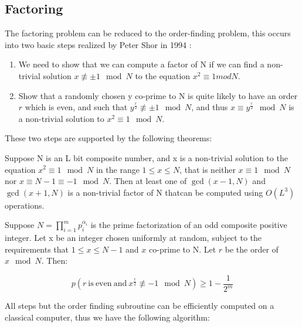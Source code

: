 \subsection{Factoring}
\label{subsec: Factoring}

The factoring problem can be reduced to the order-finding problem, this occurs into two basic steps realized by Peter Shor in 1994 \citep{Shor}: 

\begin{enumerate}
    \item We need to show that we can compute a factor of N if we can find a non-trivial solution $x \not\equiv \pm 1 \mod N$ to the equation $x^2 \equiv 1 mod N$.
    \item Show that a randomly chosen y co-prime to N is quite likely to have an order $r$ which is even, and such that $y^{\frac{r}{2}} \not\equiv \pm 1 \mod N$, and thus $x \equiv y^{\frac{r}{2}} \mod N$ is a non-trivial solution to $x^2 \equiv 1 \mod N$.
\end{enumerate}

These two steps are supported by the following theorems:

\begin{theorem}
Suppose N is an L bit composite number, and x is a non-trivial solution to the equation $x^2 \equiv 1 \mod N$ in the range $1 \leq x \leq N$, that is neither $x \equiv 1 \mod N$ nor $x \equiv N-1 \equiv -1 \mod N$. Then at least one of $\gcd(x-1, N)$ and $\gcd(x+1,N)$ is a non-trivial factor of N thatcan be computed using $O(L^3)$ operations.
\end{theorem}

\begin{theorem}
Suppose $N = \prod^m_{i=1} p_i^{\alpha_i}$ is the prime factorization of an odd composite positive integer. Let x be an integer chosen uniformly at random, subject to the requirements that $1 \leq x \leq N-1$ and $x$ co-prime to N. Let $r$ be the order of $x \mod N$. Then:

\begin{equation*}
    p(r \mathrm{\ is \ even \ and \ } x^{\frac{r}{2}} \not\equiv -1 \mod N) \geq 1 - \frac{1}{2^m}
\end{equation*}
\end{theorem}

All steps but the order finding subroutine can be efficiently computed on a classical computer, thus we have the following algorithm:

